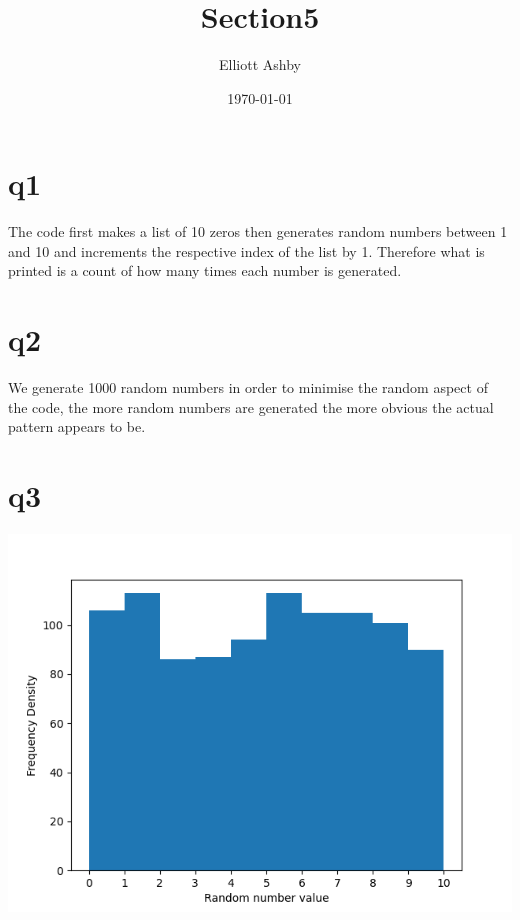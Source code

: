 \documentclass[a4paper,english]{article}
\title{Section5}
\author{Elliott Ashby}
\date{\today}
\begin{document}
    \maketitle
    \section{q1}
        The code first makes a list of 10 zeros then generates random numbers between 1 and 10 and increments the respective index of the list by 1. Therefore what is printed is
        a count of how many times each number is generated.
        \\
    \section{q2}
        We generate 1000 random numbers in order to minimise the random aspect of the code, the more random numbers are generated the more obvious the actual pattern appears to be.
        \\
    \section{q3}
    \includegraphics[scale=0.8]{q5_3.png}
    \\
\end{document}
